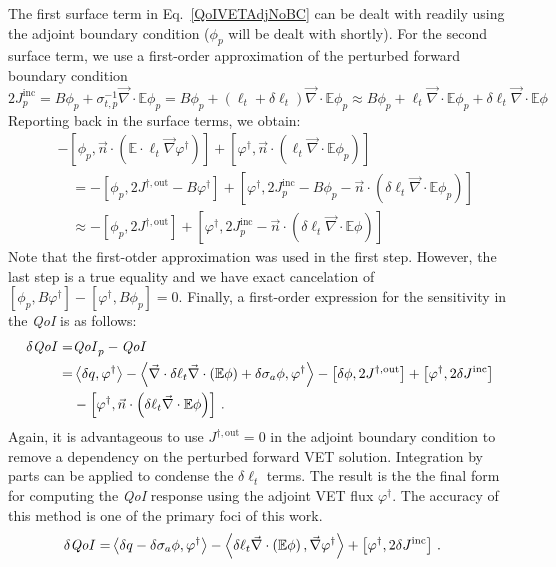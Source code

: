 \documentclass[12pt]{report}
\newcommand{\bra}{\left\langle}
\newcommand{\ket}{\right\rangle}
\newcommand{\sbra}{\left[}
\newcommand{\sket}{\right]}
\renewcommand{\div}{\vec{\nabla} \cdot}
\newcommand{\grad}{\vec{\nabla}}
\newcommand{\vefadj}{\varphi^\dag}
\newcommand{\vn}{\vec{n}}
\newcommand{\Edd}{\mathbb{E}}
\newcommand{\siga}{\sigma_a}
\newcommand{\isigt}{\ell_t}
\newcommand{\scalSource}{q}
\newcommand{\qoi}{{\it QoI}\xspace}
\begin{document}
The first surface term in Eq.~\eqref{QoIVETAdjNoBC} 
can be dealt with readily using the adjoint boundary condition ($\phi_p$ will be dealt with shortly). For the second surface term, we use a first-order approximation of the perturbed forward boundary condition  
\[
2 J_p^{\text{inc}} = B \phi_p + \sigma_{t,p}^{-1}\div \Edd \phi_p
= B \phi_p + (\isigt + \delta \isigt) \div \Edd \phi_p
\approx B \phi_p + \isigt  \div \Edd \phi_p + \delta \isigt  \div \Edd \phi
\]
Reporting back in the surface terms, we obtain:
\begin{equation}
\begin{split}
 &- \sbra \phi_p, \vn \cdot \left( \Edd \cdot \isigt \grad \vefadj \right) \sket  + \sbra \vefadj, \vn \cdot \left(  \isigt \div \Edd \phi_p \right) \sket \\
&\quad=- \sbra \phi_p, 2J^{\dag,\text{out}} - B \vefadj \sket 
+ \sbra \vefadj, 2 J_p^{\text{inc}} - B \phi_p - \vn \cdot \left( \delta \isigt \div \Edd \phi_p \right) \sket \\
&\quad \approx- \sbra \phi_p, 2J^{\dag,\text{out}} \sket + \sbra \vefadj, 2 J_p^{\text{inc}} - \vn \cdot \left( \delta \isigt \div \Edd \phi \right) \sket  
\end{split}
\end{equation}
Note that the first-otder approximation was used in the first step. However, the last step is a true equality and we have exact cancelation of $\sbra \phi_p,B \vefadj \sket - \sbra \vefadj , B\phi_p\sket=0$. Finally, a first-order expression for the sensitivity in the \qoi is as follows:
\begin{equation}
\label{QoIVETAdjlong}
\begin{split}
\delta \qoi =& \qoi_p - \qoi \\ 
=& \bra \delta \scalSource , \vefadj \ket - \bra \div \delta \isigt \div \left( \Edd \phi \right)  + \delta \siga \phi, \vefadj \ket 
- \sbra \delta \phi, 2J^{\dag,\text{out}} \sket + \sbra \vefadj, 2 \delta J^{\text{inc}} \sket \\
& - \sbra \vefadj, \vn \cdot \left( \delta \isigt \div \Edd \phi \right) \sket \,.
\end{split}
\end{equation}
Again, it is advantageous to use $J^{\dag,\text{out}}=0$ in the adjoint boundary condition to remove a dependency on the 
perturbed forward VET solution. Integration by parts can be applied to condense the $\delta \isigt$ terms. The result is the the final form for computing the \qoi response using the adjoint VET flux $\vefadj$. The accuracy of this method is one of the primary foci of this work.
\begin{equation}
\label{VETsens}
\begin{split}
\delta \qoi =&  \bra \delta \scalSource - \delta \siga \phi, \vefadj \ket  - \bra \delta \isigt \div \left( \Edd \phi \right) , \grad \vefadj \ket
 + \sbra \vefadj, 2 \delta J^{\text{inc}} \sket \,.
\end{split}
\end{equation}
\end{document}
